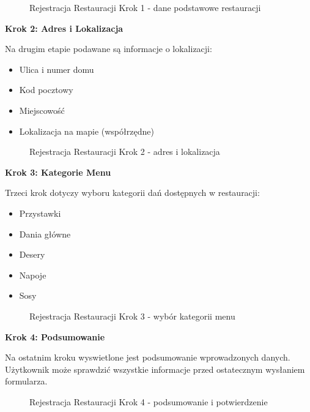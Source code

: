 \documentclass[12pt,a4paper,utf-8]{article}
\begin{document}
\begin{figure}[H]
    \centering
    \caption{Rejestracja Restauracji Krok 1  -  dane podstawowe restauracji}
    \label{fig:restaurant_registration_1}
\end{figure}

\textbf{Krok 2: Adres i Lokalizacja}

Na drugim etapie podawane są informacje o lokalizacji:
\begin{itemize}
    \item Ulica i numer domu
    \item Kod pocztowy
    \item Miejscowość
    \item Lokalizacja na mapie (współrzędne)
\end{itemize}

\begin{figure}[H]
    \centering
    \caption{Rejestracja Restauracji Krok 2  -  adres i lokalizacja}
    \label{fig:restaurant_registration_2}
\end{figure}

\textbf{Krok 3: Kategorie Menu}

Trzeci krok dotyczy wyboru kategorii dań dostępnych w restauracji:
\begin{itemize}
    \item Przystawki
    \item Dania główne
    \item Desery
    \item Napoje
    \item Sosy
\end{itemize}

\begin{figure}[H]
    \centering
    \caption{Rejestracja Restauracji Krok 3  -  wybór kategorii menu}
    \label{fig:restaurant_registration_3}
\end{figure}

\textbf{Krok 4: Podsumowanie}

Na ostatnim kroku wyswietlone jest podsumowanie wprowadzonych danych. Użytkownik może sprawdzić wszystkie informacje przed ostatecznym wysłaniem formularza.

\begin{figure}[H]
    \centering
    \caption{Rejestracja Restauracji Krok 4  -  podsumowanie i potwierdzenie}
    \label{fig:restaurant_registration_4}
\end{figure}
\end{document}
